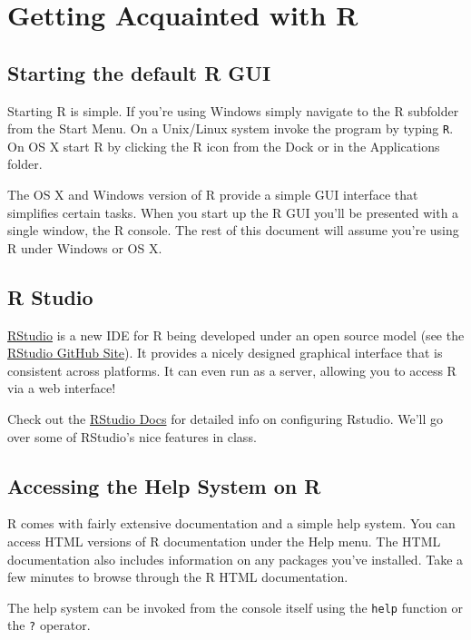 

\section{Getting Acquainted with R}

\subsection{Starting the default R GUI}

Starting R is simple. If you're using Windows simply navigate to the R
subfolder from the Start Menu. On a Unix/Linux system invoke the program
by typing \lstinline!R!. On OS X start R by clicking the R icon from the
Dock or in the Applications folder.

The OS X and Windows version of R provide a simple GUI interface that
simplifies certain tasks. When you start up the R GUI you'll be
presented with a single window, the R console. The rest of this document
will assume you're using R under Windows or OS X.

\subsection{R Studio}

\href{http://rstudio.org/}{RStudio} is a new IDE for R being developed
under an open source model (see the
\href{https://github.com/rstudio/rstudio}{RStudio GitHub Site}). It
provides a nicely designed graphical interface that is consistent across
platforms. It can even run as a server, allowing you to access R via a
web interface!

Check out the \href{http://rstudio.org/docs/}{RStudio Docs} for detailed
info on configuring Rstudio. We'll go over some of RStudio's nice
features in class.

\subsection{Accessing the Help System on R}

R comes with fairly extensive documentation and a simple help system.
You can access HTML versions of R documentation under the Help menu. The
HTML documentation also includes information on any packages you've
installed. Take a few minutes to browse through the R HTML
documentation.

The help system can be invoked from the console itself using the
\lstinline!help! function or the \lstinline!?! operator.

